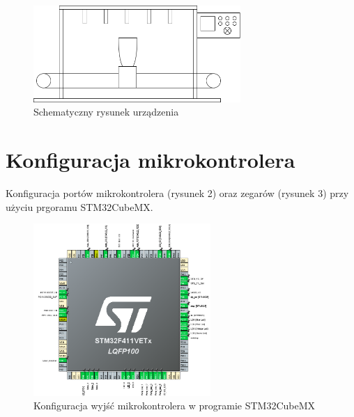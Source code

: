 \documentclass[10pt, a4paper]{article}
\begin{document}
\begin{figure}[H]
	\centering
	\includegraphics[width=0.7\textwidth]{figures/dionizos.png}
	\caption{Schematyczny rysunek urządzenia}
	\label{fig:Architektura}
\end{figure}

\section{Konfiguracja mikrokontrolera}
 
Konfiguracja portów mikrokontrolera (rysunek 2) oraz zegarów (rysunek 3) przy użyciu prgoramu STM32CubeMX.
 
\begin{figure}[H]
	\centering
	\includegraphics[width=0.6\textwidth]{konfiguracja.PNG}
	\caption{Konfiguracja wyjść mikrokontrolera w programie STM32CubeMX}
	\label{fig:KonfiguracjaMikrokontrolera}
\end{figure}
\end{document}
